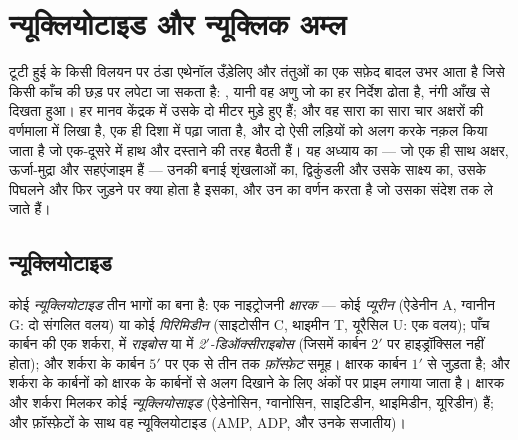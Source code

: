 \chapter{न्यूक्लियोटाइड और न्यूक्लिक अम्ल}\label{ch:b1:nucleic-acids}

टूटी हुई  के किसी विलयन पर ठंडा एथेनॉल उँड़ेलिए और तंतुओं का एक
सफ़ेद बादल उभर आता है जिसे किसी काँच की छड़ पर लपेटा जा सकता है: ,
यानी वह अणु जो  का हर निर्देश ढोता है, नंगी आँख से दिखता हुआ। हर मानव
केंद्रक में उसके दो मीटर मुड़े हुए हैं; और वह सारा का सारा चार अक्षरों की
वर्णमाला में लिखा है, एक ही दिशा में पढ़ा जाता है, और दो ऐसी लड़ियों को
अलग करके नक़ल किया जाता है जो एक-दूसरे में हाथ और दस्ताने की तरह बैठती
हैं। यह अध्याय  का --- जो एक ही साथ अक्षर, ऊर्जा-मुद्रा
और सहएंजाइम हैं --- उनकी बनाई शृंखलाओं का, द्विकुंडली और उसके साक्ष्य का,
उसके पिघलने और फिर जुड़ने पर क्या होता है इसका, और उन  का वर्णन करता
है जो उसका संदेश  तक ले जाते हैं।

\section{न्यूक्लियोटाइड}

\begin{definition}[न्यूक्लियोटाइड]\label{def:b1:nucleic-acids:nucleotide}
कोई \emph{न्यूक्लियोटाइड} तीन भागों का बना है: एक
नाइट्रोजनी \emph{क्षारक} --- कोई
\emph{प्यूरीन} (ऐडेनीन A, ग्वानीन G: दो संगलित वलय) या कोई
\emph{पिरिमिडीन} (साइटोसीन C, थाइमीन T, यूरैसिल U:
एक वलय); पाँच कार्बन की एक शर्करा,  में \emph{राइबोस} या  में
\emph{2$'$-डिऑक्सीराइबोस} (जिसमें कार्बन $2'$ पर हाइड्रॉक्सिल
नहीं होता); और शर्करा के कार्बन $5'$ पर एक से तीन तक \emph{फ़ॉस्फ़ेट}
समूह। क्षारक कार्बन $1'$ से जुड़ता है; और शर्करा के कार्बनों को
क्षारक के कार्बनों से अलग दिखाने के लिए अंकों पर प्राइम लगाया जाता है।
क्षारक और शर्करा मिलकर कोई \emph{न्यूक्लियोसाइड} (ऐडेनोसिन, ग्वानोसिन,
साइटिडीन, थाइमिडीन, यूरिडीन) हैं; और फ़ॉस्फ़ेटों के साथ वह
न्यूक्लियोटाइड (AMP, ADP,  और उनके सजातीय)।
\end{definition}

